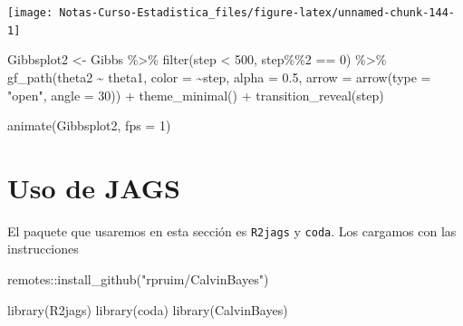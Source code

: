 \documentclass[
  12pt,
]{book}
\newenvironment{Shaded}{\begin{snugshade}}{\end{snugshade}}
\newcommand{\AttributeTok}[1]{\textcolor[rgb]{0.77,0.63,0.00}{#1}}
\newcommand{\DecValTok}[1]{\textcolor[rgb]{0.00,0.00,0.81}{#1}}
\newcommand{\FloatTok}[1]{\textcolor[rgb]{0.00,0.00,0.81}{#1}}
\newcommand{\FunctionTok}[1]{\textcolor[rgb]{0.00,0.00,0.00}{#1}}
\newcommand{\NormalTok}[1]{#1}
\newcommand{\OtherTok}[1]{\textcolor[rgb]{0.56,0.35,0.01}{#1}}
\newcommand{\SpecialCharTok}[1]{\textcolor[rgb]{0.00,0.00,0.00}{#1}}
\newcommand{\StringTok}[1]{\textcolor[rgb]{0.31,0.60,0.02}{#1}}
\theoremstyle{definition}
\theoremstyle{definition}
\theoremstyle{definition}
\theoremstyle{remark}
\begin{document}
\begin{center}\texttt{[image: Notas-Curso-Estadistica\_files/figure-latex/unnamed-chunk-144-1]} \end{center}

\begin{Shaded}
\begin{Highlighting}[]
\NormalTok{Gibbsplot2 }\OtherTok{\textless{}{-}}\NormalTok{ Gibbs }\SpecialCharTok{\%\textgreater{}\%} \FunctionTok{filter}\NormalTok{(step }\SpecialCharTok{\textless{}} \DecValTok{500}\NormalTok{, step}\SpecialCharTok{\%\%}\DecValTok{2} \SpecialCharTok{==} 
    \DecValTok{0}\NormalTok{) }\SpecialCharTok{\%\textgreater{}\%} \FunctionTok{gf\_path}\NormalTok{(theta2 }\SpecialCharTok{\textasciitilde{}}\NormalTok{ theta1, }\AttributeTok{color =} \SpecialCharTok{\textasciitilde{}}\NormalTok{step, }
    \AttributeTok{alpha =} \FloatTok{0.5}\NormalTok{, }\AttributeTok{arrow =} \FunctionTok{arrow}\NormalTok{(}\AttributeTok{type =} \StringTok{"open"}\NormalTok{, }\AttributeTok{angle =} \DecValTok{30}\NormalTok{)) }\SpecialCharTok{+} 
    \FunctionTok{theme\_minimal}\NormalTok{() }\SpecialCharTok{+} \FunctionTok{transition\_reveal}\NormalTok{(step)}

\FunctionTok{animate}\NormalTok{(Gibbsplot2, }\AttributeTok{fps =} \DecValTok{1}\NormalTok{)}
\end{Highlighting}
\end{Shaded}

\hypertarget{uso-de-jags}{%
\section{Uso de JAGS}\label{uso-de-jags}}

El paquete que usaremos en esta sección es \texttt{R2jags} y \texttt{coda}. Los cargamos con las instrucciones

\begin{Shaded}
\begin{Highlighting}[]
\NormalTok{remotes}\SpecialCharTok{::}\FunctionTok{install\_github}\NormalTok{(}\StringTok{"rpruim/CalvinBayes"}\NormalTok{)}
\end{Highlighting}
\end{Shaded}

\begin{Shaded}
\begin{Highlighting}[]
\FunctionTok{library}\NormalTok{(R2jags)}
\FunctionTok{library}\NormalTok{(coda)}
\FunctionTok{library}\NormalTok{(CalvinBayes)}
\end{Highlighting}
\end{Shaded}
\end{document}
